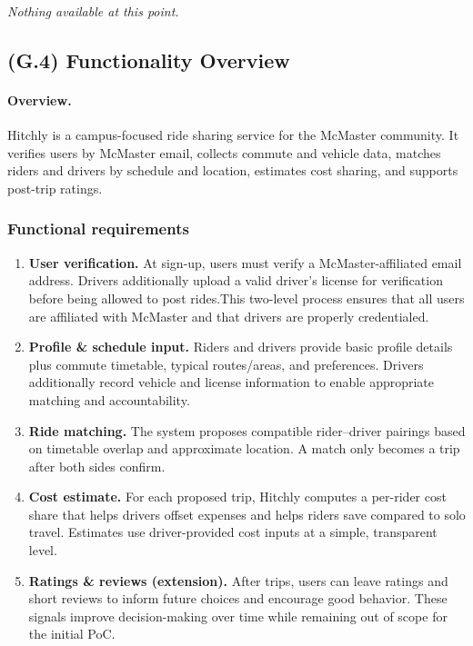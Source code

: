 \documentclass[12pt,letterpaper]{article}
\begin{document}
\textit{Nothing available at this point.}

\subsection{(G.4) Functionality Overview}

\paragraph{Overview.}
Hitchly is a campus-focused ride sharing service for the McMaster community.
It verifies users by McMaster email, collects commute and vehicle data, matches riders and drivers by schedule and location, estimates cost sharing, and supports post-trip ratings.

\subsubsection*{Functional requirements}
\begin{enumerate}
  \item \textbf{User verification.}
  At sign-up, users must verify a McMaster-affiliated email address. Drivers additionally upload a valid driver's license for verification before being allowed to post rides.This two-level process ensures that all users are affiliated with McMaster and that drivers are properly credentialed.

  \item \textbf{Profile \& schedule input.}
  Riders and drivers provide basic profile details plus commute timetable, typical routes/areas, and preferences.
  Drivers additionally record vehicle and license information to enable appropriate matching and accountability.

  \item \textbf{Ride matching.}
  The system proposes compatible rider–driver pairings based on timetable overlap and approximate location.
  A match only becomes a trip after both sides confirm.

  \item \textbf{Cost estimate.}
  For each proposed trip, Hitchly computes a per-rider cost share that helps drivers offset expenses and helps riders save compared to solo travel.
  Estimates use driver-provided cost inputs at a simple, transparent level.

  \item \textbf{Ratings \& reviews (extension).}
  After trips, users can leave ratings and short reviews to inform future choices and encourage good behavior.
  These signals improve decision-making over time while remaining out of scope for the initial PoC.
\end{enumerate}
\end{document}
